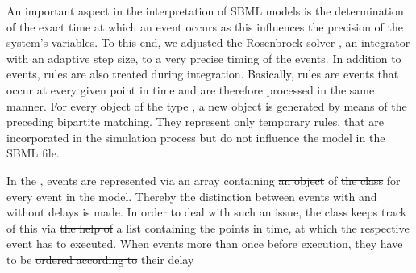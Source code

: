 \documentclass[10pt]{bmc_article}
\newenvironment{bmcformat}{\begin{raggedright}\baselineskip20pt\sloppy\setboolean{publ}{false}}{\end{raggedright}\baselineskip20pt\sloppy}
\begin{document}
\begin{bmcformat}
%
An important aspect in the interpretation of \acs{SBML} models is the
determination of the exact time at which an event occurs \sout{as}
this influences the precision of the system's variables.
To this end, we adjusted  the Rosenbrock solver
\cite{Kotcon2011},
an integrator with an adaptive step size, to a very precise timing of the
events.
In addition to events, rules are also treated during integration.
Basically, rules are  events that occur at every given point
in time and are therefore processed in the same manner.
For every object of the type \AlgebraicRule, a new \AssignmentRule object is
generated by means of the preceding bipartite matching.
They represent only temporary rules, that are incorporated in the simulation
process but do not influence the model in the \acs{SBML} file.
%

In the \SBMLinterpreter, events are represented via an array containing
\sout{an object} of \sout{the class} \EventInProgress for
every event in the model.
Thereby\COR{,} the distinction between events with and without delays is made.
In order to deal with \sout{such an issue}, the class
\SBMLEventInProgressWithDelay keeps track of this via \sout{the help of} a list
containing the points in time, at which the respective event has to 
executed.
When events  more than once before execution,
they have to be \sout{ordered according to}
their delay


\end{bmcformat}
\end{document}
